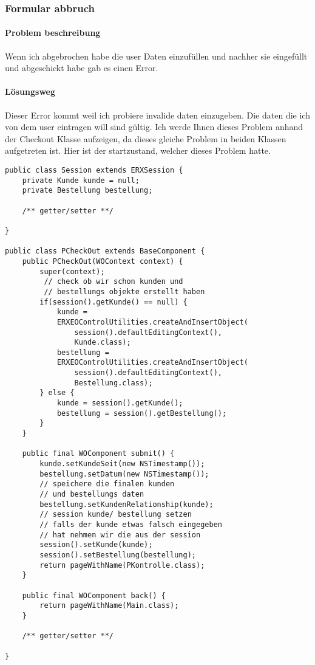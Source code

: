 \documentclass[a4paper, 11pt]{article}
\begin{document}
\subsubsection{Formular abbruch}

\paragraph{Problem beschreibung}

Wenn ich abgebrochen habe die user Daten einzufüllen und nachher sie eingefüllt und abgeschickt habe gab es einen Error.

\paragraph{Lösungsweg}

Dieser Error kommt weil ich probiere invalide daten einzugeben.
Die daten die ich von dem user eintragen will sind gültig.
Ich werde Ihnen dieses Problem anhand der Checkout Klasse aufzeigen, da dieses gleiche Problem in beiden Klassen aufgetreten ist.
Hier ist der startzustand, welcher dieses Problem hatte.

\begin{verbatim}
public class Session extends ERXSession {
	private Kunde kunde = null;
	private Bestellung bestellung;

	/** getter/setter **/

}

public class PCheckOut extends BaseComponent {
	public PCheckOut(WOContext context) {
		super(context);
		 // check ob wir schon kunden und 
		 // bestellungs objekte erstellt haben
		if(session().getKunde() == null) {
			kunde = 
			ERXEOControlUtilities.createAndInsertObject(
				session().defaultEditingContext(),
				Kunde.class);
			bestellung = 
			ERXEOControlUtilities.createAndInsertObject(
				session().defaultEditingContext(),
				Bestellung.class);
		} else {
			kunde = session().getKunde();
			bestellung = session().getBestellung();
		}
	}

	public final WOComponent submit() {
		kunde.setKundeSeit(new NSTimestamp());
		bestellung.setDatum(new NSTimestamp());
		// speichere die finalen kunden
		// und bestellungs daten
		bestellung.setKundenRelationship(kunde);
		// session kunde/ bestellung setzen
		// falls der kunde etwas falsch eingegeben 
		// hat nehmen wir die aus der session
		session().setKunde(kunde);
		session().setBestellung(bestellung);
		return pageWithName(PKontrolle.class);
	}

	public final WOComponent back() {
		return pageWithName(Main.class);
	}

	/** getter/setter **/

}
\end{verbatim}
\end{document}
